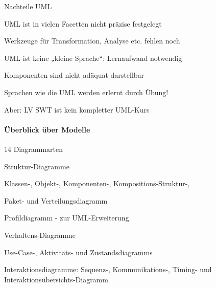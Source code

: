 \documentclass[a4paper]{article}
\begin{document}
\begin{multicols}{3}
  Nachteile UML
  \begin{itemize*}
    \item UML ist in vielen Facetten nicht präzise festgelegt
    \item Werkzeuge für Transformation, Analyse etc. fehlen noch
    \item UML ist keine „kleine Sprache“: Lernaufwand notwendig
    \item Komponenten sind nicht adäquat darstellbar
    \item Sprachen wie die UML werden erlernt durch Übung!
    \item Aber: LV SWT ist kein kompletter UML-Kurs
  \end{itemize*}

  \paragraph{Überblick über Modelle}
  \begin{itemize*}
    \item 14 Diagrammarten
    \item Struktur-Diagramme
          \begin{itemize*}
            \item Klassen-, Objekt-, Komponenten-, Kompositions-Struktur-,
            \item Paket- und Verteilungsdiagramm
            \item Profildiagramm - zur UML-Erweiterung
          \end{itemize*}
    \item Verhaltens-Diagramme
          \begin{itemize*}
            \item Use-Case-, Aktivitäts- und Zustandsdiagramms
            \item Interaktionsdiagramme: Sequenz-, Kommunikations-, Timing- und Interaktionsübersichts-Diagramm
          \end{itemize*}
  \end{itemize*}


\end{multicols}
\end{document}
